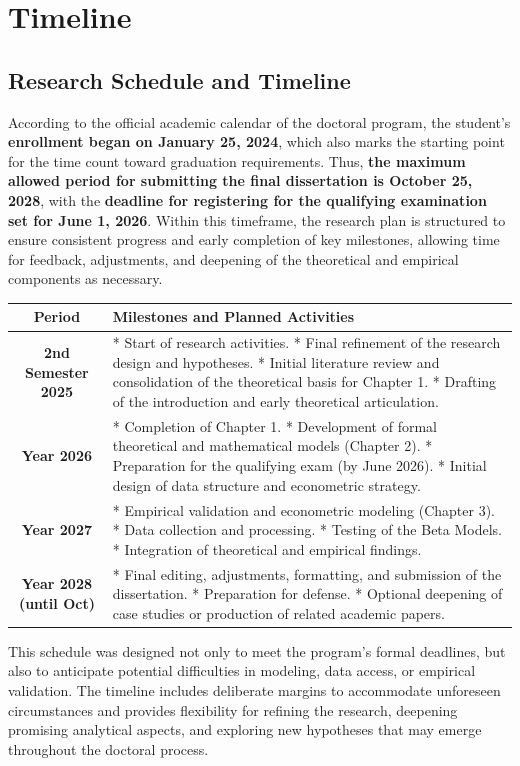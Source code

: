 
\section{Timeline}

\subsection{Research Schedule and Timeline}

According to the official academic calendar of the doctoral program, the student’s \textbf{enrollment began on January 25, 2024}, which also marks the starting point for the time count toward graduation requirements. Thus, \textbf{the maximum allowed period for submitting the final dissertation is October 25, 2028}, with the \textbf{deadline for registering for the qualifying examination set for June 1, 2026}. Within this timeframe, the research plan is structured to ensure consistent progress and early completion of key milestones, allowing time for feedback, adjustments, and deepening of the theoretical and empirical components as necessary.

\begin{table}[H]
\centering
\label{tab:timeline}
\renewcommand{\arraystretch}{1.3}
\footnotesize
\begin{tabularx}{\textwidth}{|c|X|}
\hline
\textbf{Period} & \textbf{Milestones and Planned Activities} \\
\hline
\textbf{2nd Semester 2025} & * Start of research activities. * Final refinement of the research design and hypotheses. * Initial literature review and consolidation of the theoretical basis for Chapter 1. * Drafting of the introduction and early theoretical articulation. \\
\hline
\textbf{Year 2026} & * Completion of Chapter 1. * Development of formal theoretical and mathematical models (Chapter 2). * Preparation for the qualifying exam (by June 2026). * Initial design of data structure and econometric strategy. \\
\hline
\textbf{Year 2027} & * Empirical validation and econometric modeling (Chapter 3). * Data collection and processing. * Testing of the Beta Models. * Integration of theoretical and empirical findings. \\
\hline
\textbf{Year 2028 (until Oct)} & * Final editing, adjustments, formatting, and submission of the dissertation. * Preparation for defense. * Optional deepening of case studies or production of related academic papers. \\
\hline
\end{tabularx}
\end{table}

This schedule was designed not only to meet the program's formal deadlines, but also to anticipate potential difficulties in modeling, data access, or empirical validation. The timeline includes deliberate margins to accommodate unforeseen circumstances and provides flexibility for refining the research, deepening promising analytical aspects, and exploring new hypotheses that may emerge throughout the doctoral process.


\newpage

